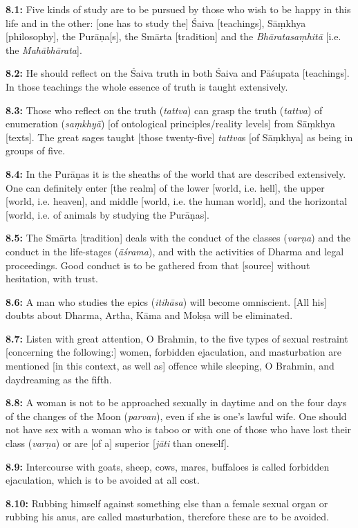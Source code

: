 \documentclass{article}
\newcommand{\vsnum}[1]{\textbf{#1}}
\newcommand{\skt}[1]{\textit{#1}}
\begin{document}
\vsnum{8.1:} Five kinds of study are to be pursued by those who wish to be happy in this life and in the other: [one has to study the] Śaiva [teachings], Sāṃkhya [philosophy], the Purāṇa[s], the Smārta [tradition] and the \skt{Bhāratasaṃhitā} [i.e. the \skt{Mahābhārata}].

\vsnum{8.2: }He should reflect on the Śaiva truth in both Śaiva and Pāśupata [teachings]. In those teachings the whole essence of truth is taught extensively.

\vsnum{8.3: }Those who reflect on the truth (\skt{tattva}) can grasp the truth (\skt{tattva}) of enumeration (\skt{saṃkhyā}) [of ontological principles/reality levels] from Sāṃkhya [texts]. The great sages taught [those twenty-five] \skt{tattva}s [of Sāṃkhya] as being in groups of five.

\vsnum{8.4: }In the Purāṇas it is the sheaths of the world that are described extensively. One can definitely enter [the realm] of the lower [world, i.e. hell], the upper [world, i.e. heaven], and middle [world, i.e. the human world], and the horizontal [world, i.e. of animals by studying the Purāṇas].

\vsnum{8.5: }The Smārta [tradition] deals with the conduct of the classes (\skt{varṇa}) and the conduct in the life-stages (\skt{āśrama}), and with the activities of Dharma and legal proceedings. Good conduct is to be gathered from that [source] without hesitation, with trust.

\vsnum{8.6: }A man who studies the epics (\skt{itihāsa}) will become omniscient. [All his] doubts about Dharma, Artha, Kāma and Mokṣa will be eliminated.

\vsnum{8.7: }Listen with great attention, O Brahmin, to the five types of sexual restraint [concerning the following:] women, forbidden ejaculation, and masturbation are mentioned [in this context, as well as] offence while sleeping, O Brahmin, and daydreaming as the fifth.

\vsnum{8.8: }A woman is not to be approached sexually in daytime and on the four days of the changes of the Moon (\skt{parvan}), even if she is one's lawful wife. One should not have sex with a woman who is taboo or with one of those who have lost their class (\skt{varṇa}) or are [of a] superior [\skt{jāti} than oneself].

\vsnum{8.9: }Intercourse with goats, sheep, cows, mares, buffaloes is called forbidden ejaculation, which is to be avoided at all cost.

\vsnum{8.10: }Rubbing himself against something else than a female sexual organ or rubbing his anus, are called masturbation, therefore these are to be avoided.
\end{document}

